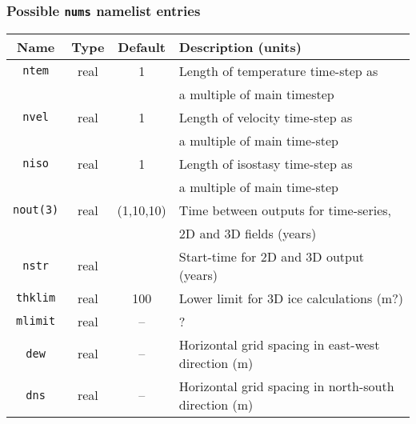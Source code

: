 \documentclass[11pt]{article}
\begin{document}
\subsubsection{Possible \texttt{nums} namelist entries}
%
\begin{center}
\begin{tabular}{|c|c|c|l|}
\hline
Name & Type & Default & Description (units)\\
\hline
\hline
\texttt{ntem}    & real & 1 & Length of temperature time-step as \\
 & & & a multiple of main timestep \\
\hline
\texttt{nvel}    & real & 1 & Length of velocity time-step as \\
 & & & a multiple of main time-step\\
\hline
\texttt{niso}    & real & 1 & Length of isostasy time-step as \\
 & & & a multiple of main time-step\\
\hline
\texttt{nout(3)} & real & (1,10,10) & Time between outputs for time-series, \\
 & & & 2D and 3D fields (years)\\
\hline
\texttt{nstr}    & real & & Start-time for 2D and 3D output (years) \\
\hline
\texttt{thklim} & real & 100 & Lower limit for 3D ice calculations (m?) \\
\hline
\texttt{mlimit} & real & -- & ? \\
\hline
\texttt{dew} & real & -- & Horizontal grid spacing in east-west direction (m)
\\
\hline
\texttt{dns} & real & -- & Horizontal grid spacing in north-south direction (m) \\
\hline
\end{tabular}
\end{center}
%
\end{document}
